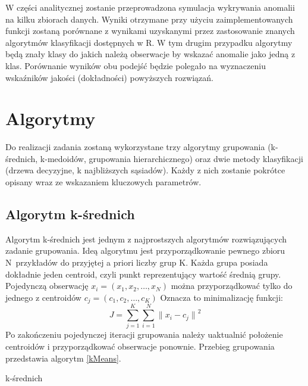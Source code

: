 \documentclass[11pt,a4paper,twoside]{article}
\begin{document}
W części analitycznej zostanie przeprowadzona symulacja wykrywania anomalii na kilku zbiorach danych. Wyniki otrzymane przy użyciu zaimplementowanych funkcji zostaną porównane z wynikami uzyskanymi przez zastosowanie znanych algorytmów klasyfikacji dostępnych w R. W tym drugim przypadku algorytmy będą znały klasy do jakich należą obserwacje by wskazać anomalie jako jedną z klas. Porównanie wyników obu podejść będzie polegało na wyznaczeniu wskaźników jakości (dokładności) powyższych rozwiązań.

\section{Algorytmy}
Do realizacji zadania zostaną wykorzystane trzy algorytmy grupowania (k-średnich, k-medoidów, grupowania hierarchicznego) oraz dwie metody klasyfikacji (drzewa decyzyjne, k najbliższych sąsiadów). Każdy z nich zostanie pokrótce opisany wraz ze wskazaniem kluczowych parametrów.

\subsection{Algorytm k-średnich}
Algorytm k-średnich jest jednym z najprostszych algorytmów rozwiązujących zadanie grupowania. Ideą algorytmu jest przyporządkowanie pewnego zbioru \mbox{N przykładów} do przyjętej a priori liczby grup K. Każda grupa posiada dokładnie jeden centroid, czyli punkt reprezentujący wartość średnią grupy. Pojedynczą obserwację $x_{i} = (x_{1}, x_{2},\ldots, x_{N})$ można przyporządkować tylko do jednego z centroidów $c_{j} = (c_{1}, c_{2},\ldots, c_{K})$ Oznacza to minimalizację funkcji: \begin{equation}
J = \sum_{j=1}^{K}{\sum_{i=1}^{N} {\|x_{i}-c_{j}\|}^{2}}
\end{equation} Po zakończeniu pojedynczej iteracji grupowania należy uaktualnić położenie centroidów i przyporządkować obserwacje ponownie. Przebieg grupowania przedstawia algorytm \ref{kMeans}.
\begin{algorithm}[ht]
\caption{k-średnich}
\label{kMeans}
	\begin{algorithmic}%
	\end{algorithmic}
\end{algorithm}
\end{document}
